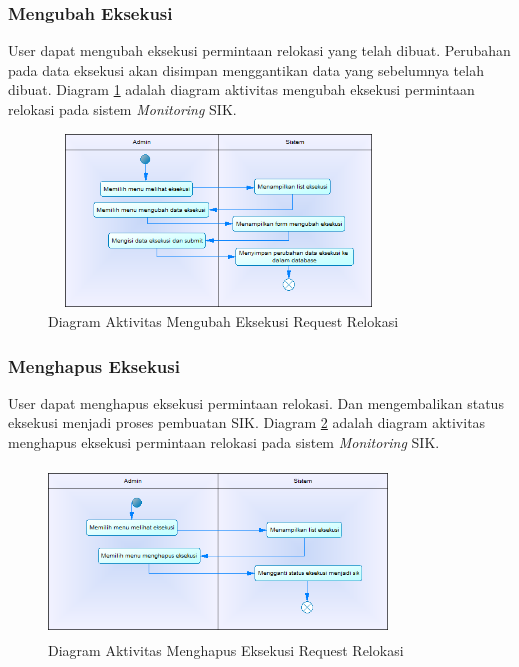 	\subsubsection{Mengubah Eksekusi}
	User dapat mengubah eksekusi permintaan relokasi yang telah dibuat. Perubahan pada data eksekusi akan disimpan menggantikan data yang sebelumnya telah dibuat. Diagram \ref{figure:activity_mengubah_eksekusi} adalah diagram aktivitas mengubah eksekusi permintaan relokasi pada sistem \textit{Monitoring} SIK.
	\begin{figure}[h]
	\centerline {\includegraphics[width=9cm,height=4.6cm]{bab4/ActivityDiagram_MengubahEksekusi.png}}
	\caption{Diagram Aktivitas Mengubah Eksekusi Request Relokasi}
	\label{figure:activity_mengubah_eksekusi}
	\end{figure}

	\subsubsection{Menghapus Eksekusi}
	User dapat menghapus eksekusi permintaan relokasi. Dan mengembalikan status eksekusi menjadi proses pembuatan SIK. Diagram \ref{figure:activity_menghapus_eksekusi} adalah diagram aktivitas menghapus eksekusi permintaan relokasi pada sistem \textit{Monitoring} SIK.
	\begin{figure}[h]
	\centerline {\includegraphics[width=9cm,height=4.5cm]{bab4/ActivityDiagram_MenghapusEksekusi.png}}
	\caption{Diagram Aktivitas Menghapus Eksekusi Request Relokasi}
	\label{figure:activity_menghapus_eksekusi}
	\end{figure}		

